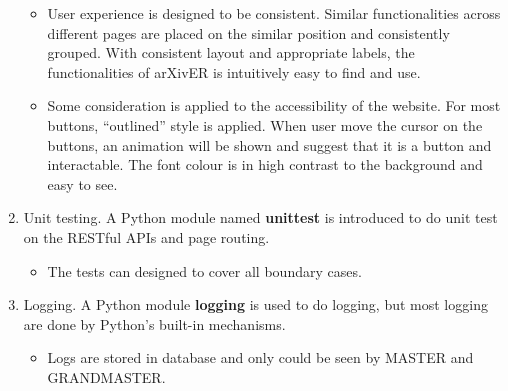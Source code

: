 \documentclass[letterpaper,12pt]{article}
\begin{document}
\begin{enumerate}[label=\alph*)]
\begin{itemize}
                \item User experience is designed to be consistent. Similar functionalities across different pages are placed on the similar position and consistently grouped. With consistent layout and appropriate labels, the functionalities of arXivER is intuitively easy to find and use.
                
                \item Some consideration is applied to the accessibility of the website. For most buttons, ``outlined'' style is applied. When user move the cursor on the buttons, an animation will be shown and suggest that it is a button and interactable.
                 The font colour is in high contrast to the background and easy to see.
            \end{itemize}
        \item Unit testing. A Python module named \textbf{unittest} is introduced to do unit test on the RESTful APIs and page routing.
            \begin{itemize}
                \item The tests can designed to cover all boundary cases.
            \end{itemize}
        \item Logging. A Python module \textbf{logging} is used to do logging, but most logging are done by Python's built-in mechanisms. 
            \begin{itemize}
                \item Logs are stored in database and only could be seen by MASTER and GRANDMASTER. 
                

\end{itemize}
\end{enumerate}
\end{document}

